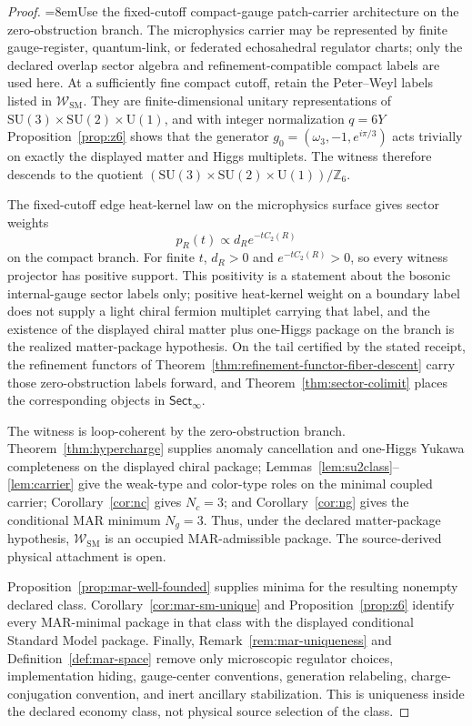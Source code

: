 \documentclass[11pt]{article}
\newcommand{\SU}{\mathrm{SU}}
\newcommand{\U}{\mathrm{U}}
\begin{document}
\begin{proof}
{\emergencystretch=8em\relax Use the fixed-cutoff compact-gauge patch-carrier architecture on the zero-obstruction branch. The
microphysics carrier may be represented by finite gauge-register, quantum-link, or federated
echosahedral regulator charts; only the declared overlap sector algebra and refinement-compatible
compact labels are used here. At a sufficiently fine compact cutoff, retain the Peter--Weyl labels
listed in \(\mathcal W_{\mathrm{SM}}\). They are finite-dimensional unitary representations of
\(\SU(3)\times\SU(2)\times\U(1)\), and with integer normalization \(q=6Y\)
Proposition~\ref{prop:z6} shows that the generator \(g_0=(\omega_3,-1,e^{i\pi/3})\) acts trivially
on exactly the displayed matter and Higgs multiplets. The witness therefore descends to the
quotient \((\SU(3)\times\SU(2)\times\U(1))/\mathbb Z_6\).\par}

The fixed-cutoff edge heat-kernel law on the microphysics surface gives sector weights
\[
p_R(t)\propto d_R e^{-tC_2(R)}
\]
on the compact branch. For finite \(t\), \(d_R>0\) and \(e^{-tC_2(R)}>0\), so every witness projector has positive support. This positivity is a statement about the bosonic internal-gauge sector labels only; positive heat-kernel weight on a boundary label does not supply a light chiral fermion multiplet carrying that label, and the existence of the displayed chiral matter plus one-Higgs package on the branch is the realized matter-package hypothesis. On the tail certified by the stated receipt, the refinement functors of Theorem~\ref{thm:refinement-functor-fiber-descent} carry those zero-obstruction labels forward, and Theorem~\ref{thm:sector-colimit} places the corresponding objects in \(\mathsf{Sect}_\infty\).

The witness is loop-coherent by the zero-obstruction branch. Theorem~\ref{thm:hypercharge} supplies anomaly cancellation and one-Higgs Yukawa completeness on the displayed chiral package; Lemmas~\ref{lem:su2class}--\ref{lem:carrier} give the weak-type and color-type roles on the minimal coupled carrier; Corollary~\ref{cor:nc} gives \(N_c=3\); and Corollary~\ref{cor:ng} gives the conditional MAR minimum \(N_g=3\). Thus, under the declared matter-package hypothesis, \(\mathcal W_{\mathrm{SM}}\) is an occupied MAR-admissible package. The source-derived physical attachment is open.

Proposition~\ref{prop:mar-well-founded} supplies minima for the resulting nonempty declared class. Corollary~\ref{cor:mar-sm-unique} and Proposition~\ref{prop:z6} identify every MAR-minimal package in that class with the displayed conditional Standard Model package. Finally, Remark~\ref{rem:mar-uniqueness} and Definition~\ref{def:mar-space} remove only microscopic regulator choices, implementation hiding, gauge-center conventions, generation relabeling, charge-conjugation convention, and inert ancillary stabilization. This is uniqueness inside the declared economy class, not physical source selection of the class.
\end{proof}
\end{document}
